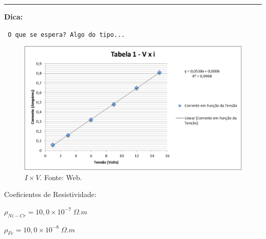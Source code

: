 \noindent
{\color{red} \rule{\linewidth}{0.5mm} }
\textbf{Dica:}

\noindent \texttt{ O que se espera? Algo do tipo...}


\begin{figure}[H]
	\centering
	\includegraphics[scale=.4]{img/lei-de-ohm.jpg}
	\caption{$I \times V$. Fonte: Web.}
	\label{fig:imagem1}
\end{figure}

\noindent Coeficientes de Resistividade:

\noindent $\rho_{Ni-Cr} = 10,0 \times 10^{-7}\;\Omega.m$

\noindent $\rho_{Fe} = 10,0 \times 10^{-8}\;\Omega.m$






